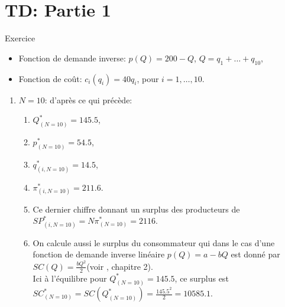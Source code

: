 \section{TD: Partie 1}
\frame{\sectionpage}
\begin{frame}[allowframebreaks]{Exercice}
    \begin{itemize}
        \item Fonction de demande inverse: $p(Q) = 200-Q$, $Q=q_1+\ldots + q_{10}$, 
        \item Fonction de coût: $c_i(q_i) = 40q_i$, pour $i=1, \ldots, 10$.
    \end{itemize}
    \begin{enumerate}
        \item $N = 10$: d'après ce qui précède:
        \begin{enumerate}[$\star$]
        \item $Q^*_{(N=10)} = 145.5$, 
        \item $p^*_{(N=10)}=54.5$, 
        \item $q_{(i, N=10)}^* = 14.5$,  
        \item $\pi_{(i, N=10)}^*= 211.6$. 
        \item Ce dernier chiffre donnant un surplus des producteurs de $SP_{(i, N=10)}^* = N\pi_{(N=10)}^*=2116$.
        \item  On calcule aussi le surplus du consommateur qui dans le cas d'une fonction de demande inverse 
        linéaire $p(Q) = a-bQ$ est donné par $SC(Q) = \frac{bQ^2}{2}$(voir \citet{belleflamme_peitz_2015}, chapitre 2).\\ Ici à l'équilibre 
        pour $Q^*_{(N=10)} = 145.5$,
         ce surplus est $SC_{(N=10)}^* = SC(Q_{(N=10)}^*) = \frac{145.5^2}{2}  = 10585.1$.
        \end{enumerate}
        

\end{enumerate}
\end{frame}
